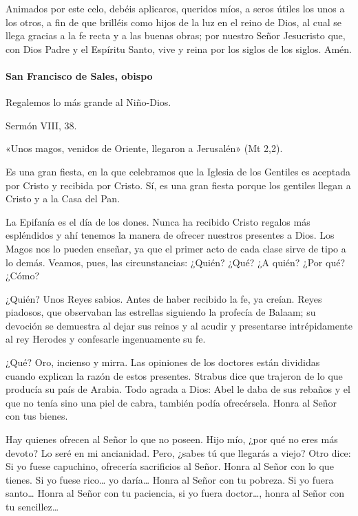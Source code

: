 \documentclass[]{article}
\let\oldparagraph\paragraph
\renewcommand{\paragraph}[1]{\oldparagraph{#1}\mbox{}}
\begin{document}
Animados por este celo, debéis aplicaros, queridos míos, a seros útiles
los unos a los otros, a fin de que brilléis como hijos de la luz en el
reino de Dios, al cual se llega gracias a la fe recta y a las buenas
obras; por nuestro Señor Jesucristo que, con Dios Padre y el Espíritu
Santo, vive y reina por los siglos de los siglos. Amén.

\paragraph{San Francisco de Sales,
obispo}\label{san-francisco-de-sales-obispo}

Regalemos lo más grande al Niño-Dios.

Sermón VIII, 38.

«Unos magos, venidos de Oriente, llegaron a Jerusalén» (Mt 2,2).

Es una gran fiesta, en la que celebramos que la Iglesia de los Gentiles
es aceptada por Cristo y recibida por Cristo. Sí, es una gran fiesta
porque los gentiles llegan a Cristo y a la Casa del Pan.

La Epifanía es el día de los dones. Nunca ha recibido Cristo regalos más
espléndidos y ahí tenemos la manera de ofrecer nuestros presentes a
Dios. Los Magos nos lo pueden enseñar, ya que el primer acto de cada
clase sirve de tipo a lo demás. Veamos, pues, las circunstancias:
¿Quién? ¿Qué? ¿A quién? ¿Por qué? ¿Cómo?

¿Quién? Unos Reyes sabios. Antes de haber recibido la fe, ya creían.
Reyes piadosos, que observaban las estrellas siguiendo la profecía de
Balaam; su devoción se demuestra al dejar sus reinos y al acudir y
presentarse intrépidamente al rey Herodes y confesarle ingenuamente su
fe.

¿Qué? Oro, incienso y mirra. Las opiniones de los doctores están
divididas cuando explican la razón de estos presentes. Strabus dice que
trajeron de lo que producía su país de Arabia. Todo agrada a Dios: Abel
le daba de sus rebaños y el que no tenía sino una piel de cabra, también
podía ofrecérsela. Honra al Señor con tus bienes.

Hay quienes ofrecen al Señor lo que no poseen. Hijo mío, ¿por qué no
eres más devoto? Lo seré en mi ancianidad. Pero, ¿sabes tú que llegarás
a viejo? Otro dice: Si yo fuese capuchino, ofrecería sacrificios al
Señor. Honra al Señor con lo que tienes. Si yo fuese rico\ldots{} yo
daría\ldots{} Honra al Señor con tu pobreza. Si yo fuera santo\ldots{}
Honra al Señor con tu paciencia, si yo fuera doctor\ldots{}, honra al
Señor con tu sencillez\ldots{}
\end{document}
